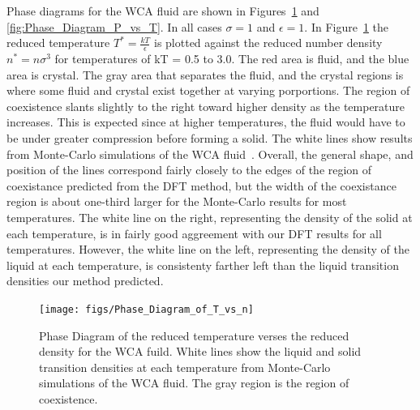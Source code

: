\documentclass[double,12pt]{beavtex}
\begin{document}
Phase diagrams for the WCA fluid are shown in Figures~\ref{fig:Phase_Diagram_of_T_vs_n} 
and \ref{fig:Phase_Diagram_P_vs_T}. In all cases $\sigma=1$ and $\epsilon=1$. 
In Figure~\ref{fig:Phase_Diagram_of_T_vs_n} the reduced temperature $T^*=\frac{kT}{\epsilon}$ 
is plotted against the reduced number density $n^*=n\sigma^3$ for temperatures of kT = 0.5 to 3.0. 
The red area is fluid, and the blue area is crystal. The gray area that separates the fluid, 
and the crystal regions is where some fluid and crystal exist together at varying porportions. 
The region of coexistence slants slightly to the right toward higher density as the temperature 
increases. This is expected since at higher temperatures, the fluid would have to be under 
greater compression before forming a solid. The white lines show results from Monte-Carlo 
simulations of the WCA fluid~\cite{May}. Overall, the general shape, and position of the lines correspond
fairly closely to the edges of the region of coexistance predicted from the DFT method, 
but the width of the coexistance region is about one-third larger for the Monte-Carlo results 
for most temperatures. The white line on the right, representing the density of the solid at 
each temperature, is in fairly good aggreement with our DFT results for all temperatures. 
However, the white line on the left, representing the density of the liquid at each temperature, 
is consistenty farther left than the liquid transition densities our method predicted.


\begin{figure}
  \centering
  \texttt{[image: figs/Phase\_Diagram\_of\_T\_vs\_n]}
  \caption{Phase Diagram of the reduced temperature verses the reduced density for the WCA fuild. 
  White lines show the liquid and solid transition densities at each temperature from 
  Monte-Carlo simulations of the WCA fluid. The gray region is the region of coexistence.}
  \label{fig:Phase_Diagram_of_T_vs_n}
\end{figure}
\end{document}

